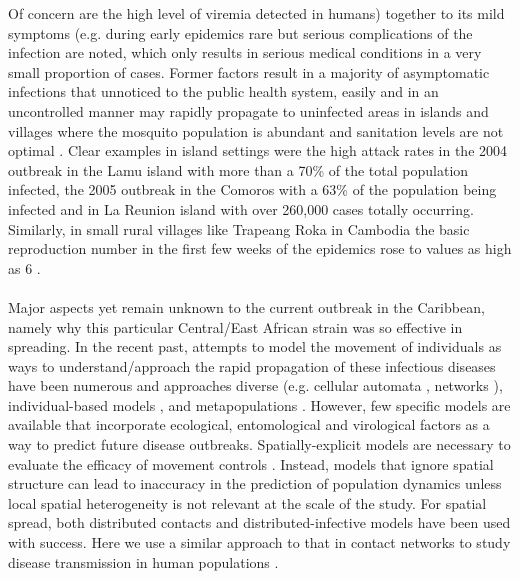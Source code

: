 \documentclass[10pt,a4paper]{article}
\begin{document}
Of concern are the high level of viremia detected in humans\citep{lanciotti2007chikungunya, staples2009chikungunya}) together   to  its   mild symptoms (e.g. during  early epidemics rare but serious complications of the infection are noted, which only results in serious medical conditions in a very small proportion of cases\citep{borgherini2007outbreak}. Former factors result in a majority of asymptomatic infections that unnoticed to the public health system, easily and in an uncontrolled manner may rapidly propagate to uninfected areas in   islands and villages where the mosquito population is abundant and sanitation levels are not optimal \citep{dommar2014agent}. Clear examples in island settings were the high attack rates in the 2004 outbreak in the Lamu island with more than a 70\% of the total   population infected\citep{sergon2008seroprevalence}, the 2005   outbreak   in   the Comoros with a 63\% of the population being infected \citep{sergon2007seroprevalence} and in La Reunion island \citep{chretien2007chikungunya} with over 260,000 cases totally occurring. Similarly, in small rural villages like Trapeang Roka in Cambodia the basic reproduction number in the first few weeks of the epidemics rose to values as high as 6 \citep{robinson2014model}.
%
\\\\
Major aspects yet remain unknown to the current outbreak in the Caribbean, namely why this particular Central/East African strain was so effective in spreading. In the recent past, attempts to model the movement of individuals as ways to understand/approach the rapid propagation of these infectious diseases have been numerous and approaches diverse (e.g. cellular automata \citep{fuks2001individual}, networks \citep{newman2002spread}), individual-based models \citep{bian2004conceptual}, and metapopulations \citep{keeling2000bubonic}. However, few specific models are available that incorporate ecological, entomological and virological factors as a way to predict future disease outbreaks. Spatially-explicit models are necessary to evaluate the efficacy of movement controls \citep{riley2003transmission, eubank2004modelling}. Instead, models that ignore spatial structure can lead to inaccuracy in the prediction of population dynamics \citep{durrett1994importance} unless local spatial heterogeneity is not relevant at the scale of the study. For spatial spread, both distributed contacts and distributed-infective models have been used with success. Here we use a similar approach to that in contact networks to study disease transmission in human populations \citep{newman2002spread, myers1967concurrent, read2003disease}.
\end{document}

